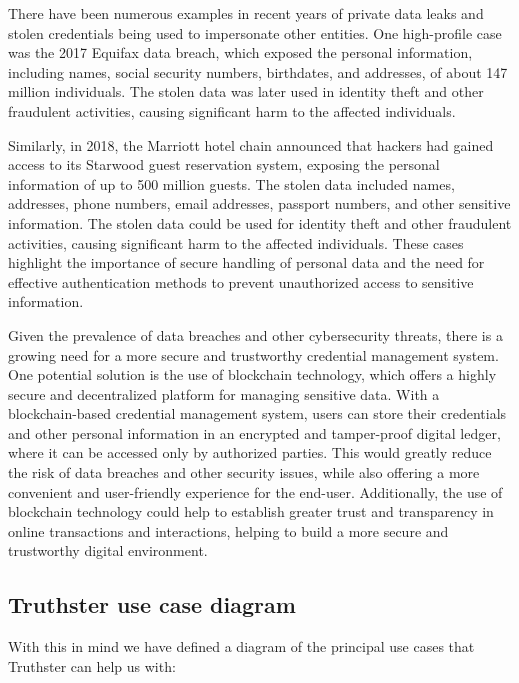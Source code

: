 \documentclass[target=mst,aauheader=]{thud}
\begin{document}
There have been numerous examples in recent years of private data leaks and stolen credentials being used to impersonate other entities. One high-profile case was the 2017 Equifax data breach\cite{equifaxDataBreachSettlement}, which exposed the personal information, including names, social security numbers, birthdates, and addresses, of about 147 million individuals. The stolen data was later used in identity theft and other fraudulent activities, causing significant harm to the affected individuals.\par
Similarly, in 2018, the Marriott hotel chain announced that hackers had gained access to its Starwood guest reservation system\cite{marriotDataBreach}, exposing the personal information of up to 500 million guests. The stolen data included names, addresses, phone numbers, email addresses, passport numbers, and other sensitive information. The stolen data could be used for identity theft and other fraudulent activities, causing significant harm to the affected individuals. These cases highlight the importance of secure handling of personal data and the need for effective authentication methods to prevent unauthorized access to sensitive information.\par
Given the prevalence of data breaches and other cybersecurity threats, there is a growing need for a more secure and trustworthy credential management system. One potential solution is the use of blockchain technology, which offers a highly secure and decentralized platform for managing sensitive data. With a blockchain-based credential management system, users can store their credentials and other personal information in an encrypted and tamper-proof digital ledger, where it can be accessed only by authorized parties. This would greatly reduce the risk of data breaches and other security issues, while also offering a more convenient and user-friendly experience for the end-user. Additionally, the use of blockchain technology could help to establish greater trust and transparency in online transactions and interactions, helping to build a more secure and trustworthy digital environment.

\subsection{Truthster use case diagram}
With this in mind we have defined a diagram of the principal use cases that Truthster can help us with:
\end{document}
